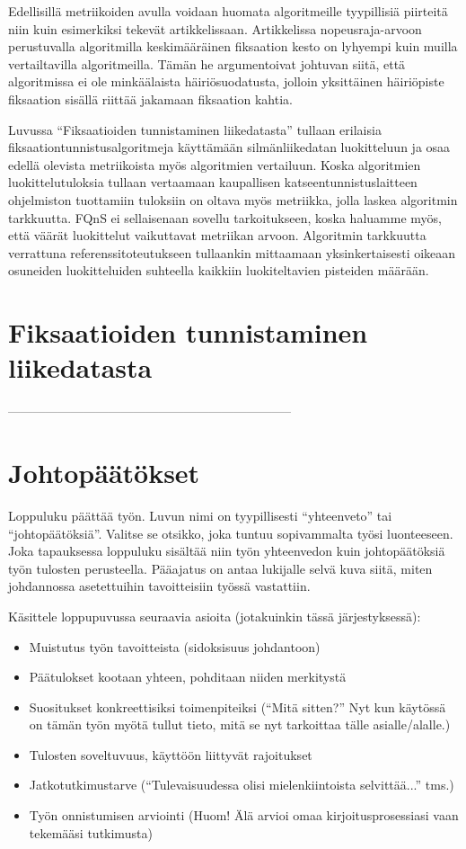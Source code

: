 Edellisillä metriikoiden avulla voidaan huomata algoritmeille tyypillisiä piirteitä niin kuin esimerkiksi \citet[s. 195]{nystrom2010} tekevät artikkelissaan. Artikkelissa nopeusraja-arvoon perustuvalla algoritmilla keskimääräinen fiksaation kesto on lyhyempi kuin muilla vertailtavilla algoritmeilla. Tämän he argumentoivat johtuvan siitä, että algoritmissa ei ole minkäälaista häiriösuodatusta, jolloin yksittäinen häiriöpiste fiksaation sisällä riittää jakamaan fiksaation kahtia.

Luvussa ``Fiksaatioiden tunnistaminen liikedatasta'' tullaan erilaisia fiksaationtunnistusalgoritmeja käyttämään silmänliikedatan luokitteluun ja osaa edellä olevista metriikoista myös algoritmien vertailuun. Koska algoritmien luokittelutuloksia tullaan vertaamaan kaupallisen katseentunnistuslaitteen ohjelmiston tuottamiin tuloksiin on oltava myös metriikka, jolla laskea algoritmin tarkkuutta. FQnS ei sellaisenaan sovellu tarkoitukseen, koska haluamme myös, että väärät luokittelut vaikuttavat metriikan arvoon. Algoritmin  tarkkuutta verrattuna referenssitoteutukseen tullaankin mittaamaan yksinkertaisesti oikeaan osuneiden luokitteluiden suhteella kaikkiin luokiteltavien pisteiden määrään.




\section{Fiksaatioiden tunnistaminen liikedatasta}

\label{sec:esimluku}

 --------------------------------------------------------------------

\section{Johtopäätökset}

Loppuluku päättää työn. Luvun nimi on tyypillisesti ``yhteenveto'' tai
``johtopäätöksiä''. Valitse se otsikko, joka tuntuu sopivammalta työsi
luonteeseen. Joka tapauksessa loppuluku sisältää niin työn yhteenvedon
kuin johtopäätöksiä työn tulosten perusteella. Pääajatus on antaa
lukijalle selvä kuva siitä, miten johdannossa asetettuihin
tavoitteisiin työssä vastattiin.

Käsittele loppupuvussa seuraavia asioita (jotakuinkin tässä järjestyksessä):
%
\begin{itemize}
  \item Muistutus työn tavoitteista (sidoksisuus johdantoon)
  \item Päätulokset kootaan yhteen, pohditaan niiden merkitystä
  \item Suositukset konkreettisiksi toimenpiteiksi (``Mitä sitten?'' 
Nyt kun käytössä on tämän työn myötä tullut tieto, 
mitä se nyt tarkoittaa tälle asialle/alalle.)
  \item Tulosten soveltuvuus, käyttöön liittyvät rajoitukset
  \item Jatkotutkimustarve 
(``Tulevaisuudessa olisi mielenkiintoista selvittää...'' tms.)
  \item Työn onnistumisen arviointi 
(Huom! Älä arvioi omaa kirjoitusprosessiasi vaan tekemääsi tutkimusta)
\end{itemize}


